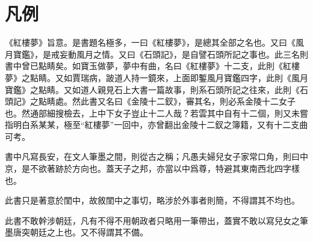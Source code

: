 \chapter*{凡例}

\begin{qute2sp}
    \large
    \begin{parag}
        《紅樓夢》旨意。是書題名極多，一曰《紅樓夢》，是總其全部之名也。又曰《風月寶鑑》，是戒妄動風月之情。又曰《石頭記》，是自譬石頭所記之事也。此三名則書中曾已點睛矣。如寶玉做夢，夢中有曲，名曰《紅樓夢》十二支，此則《紅樓夢》之點睛。又如賈瑞病，跛道人持一鏡來，上面即鏨風月寶鑑四字，此則《風月寶鑑》之點睛。又如道人親見石上大書一篇故事，則系石頭所記之往來，此則《石頭記》之點睛處。然此書又名曰《金陵十二釵》，審其名，則必系金陵十二女子也。然通部細搜檢去，上中下女子豈止十二人哉？若雲其中自有十二個，則又未嘗指明白系某某，極至“紅樓夢”一回中，亦曾翻出金陵十二釵之簿籍，又有十二支曲可考。
    \end{parag}

    \begin{parag}
        書中凡寫長安，在文人筆墨之間，則從古之稱；凡愚夫婦兒女子家常口角，則曰中京，是不欲著跡於方向也。蓋天子之邦，亦當以中爲尊，特避其東南西北四字樣也。
    \end{parag}

    \begin{parag}
        此書只是著意於閨中，故敘閨中之事切，略涉於外事者則簡，不得謂其不均也。
    \end{parag}

    \begin{parag}
        此書不敢幹涉朝廷，凡有不得不用朝政者只略用一筆帶出，蓋實不敢以寫兒女之筆墨唐突朝廷之上也。又不得謂其不備。
    \end{parag}
\end{qute2sp}

\cleardoublepage
\clearpage